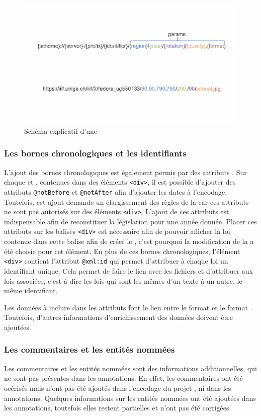 \begin{figure}
    \centering
    \includegraphics[width=\textwidth]{images/iiif.png}
    \caption{Schéma explicatif d'une \URL \IIIF}
\end{figure}

\subsubsection{Les bornes chronologiques et les identifiants \XML}
L'ajout des bornes chronologiques est également permis par des attributs \TEI. Sur chaque \lu et \li, contenues dans des éléments \texttt{<div>}, il est possible d'ajouter des attributs \texttt{@notBefore} et \texttt{@notAfter} afin d'ajouter les dates à l'encodage. Toutefois, cet ajout demande un élargissement des règles de la \TEI car ces attributs ne sont pas autorisés sur des éléments \texttt{<div>}. L'ajout de ces attributs est indispensable afin de reconstituer la législation pour une année donnée. Placer ces attributs sur les balises \texttt{<div>} est nécessaire afin de pouvoir afficher la loi contenue dans cette balise afin de créer le \cv, c'est pourquoi la modification de la \TEI a été choisie pour cet élément. En plus de ces bornes chronologiques, l'élément \texttt{<div>} contient l'attribut \texttt{@xml:id} qui permet d'attribuer à chaque loi un identifiant unique. Cela permet de faire le lien avec les fichiers \JSON et d'attribuer aux lois associées, c'est-à-dire les lois qui sont les mêmes d'un texte à un autre, le même identifiant. 

Les données à inclure dans les attributs font le lien entre le format \XML et le format \JSON. Toutefois, d'autres informations d'enrichissement des données doivent être ajoutées. 

\subsubsection{Les commentaires et les entités nommées}
Les commentaires et les entités nommées sont des informations additionnelles, qui ne sont pas présentes dans les annotations. En effet, les commentaires ont été océrisés mais n'ont pas été ajoutés dans l'encodage \XML du projet \LSC, ni dans les annotations. Quelques informations sur les entités nommées ont été ajoutées dans les annotations, toutefois elles restent partielles et n'ont pas été corrigées. 

